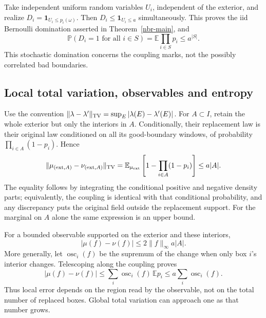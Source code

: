 Take independent uniform random variables \(U_i\), independent of the
exterior, and realize \(D_i=\mathbf1_{U_i\le p_i(\omega)}\).
Then \(D_i\le\mathbf1_{U_i\le a}\) simultaneously. This proves the
iid Bernoulli domination asserted in Theorem~\ref{nbr-main}, and
\begin{equation}
 \mathbb P(D_i=1\text{ for all }i\in S)
 =\mathbb E\prod_{i\in S}p_i\le a^{|S|}.
 \label{nbr-discrepancy-joint}
\end{equation}
This stochastic domination concerns the coupling marks, not the
possibly correlated bad boundaries.

\subsection{Local total variation, observables and entropy}
\label{nbr-local-section}

Use the convention
\(\|\lambda-\lambda'\|_{\rm TV}=\sup_E|\lambda(E)-\lambda'(E)|\).
For \(A\subset I\), retain the whole exterior but only the interiors
in \(A\). Conditionally, their replacement law is their original law
conditioned on all its good-boundary windows, of probability
\(\prod_{i\in A}(1-p_i)\). Hence
\begin{equation}
 \|\mu_{({\rm ext},A)}-\nu_{({\rm ext},A)}\|_{\rm TV}
 =\mathbb E_{\mu_{\rm ext}}
       \left[1-\prod_{i\in A}(1-p_i)\right]
 \le a|A|.
 \label{nbr-local-tv}
\end{equation}
The equality follows by integrating the conditional positive and
negative density parts; equivalently, the coupling is identical with
that conditional probability, and any discrepancy puts the original
field outside the replacement support. For the marginal on \(A\)
alone the same expression is an upper bound.

For a bounded observable supported on the exterior and these interiors,
\begin{equation}
 |\mu(f)-\nu(f)|\le2\|f\|_\infty a|A|.
 \label{nbr-local-observable}
\end{equation}
More generally, let \(\operatorname{osc}_i(f)\) be the supremum of the
change when only box \(i\)'s interior changes. Telescoping along the
coupling proves
\begin{equation}
 |\mu(f)-\nu(f)|
 \le\sum_i\operatorname{osc}_i(f)\,\mathbb E p_i
 \le a\sum_i\operatorname{osc}_i(f).
 \label{nbr-oscillation}
\end{equation}
Thus local error depends on the region read by the observable, not on
the total number of replaced boxes. Global total variation can approach
one as that number grows.

